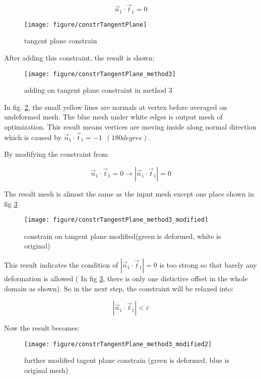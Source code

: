\begin{equation*}
\vec{n}_1 \cdot \vec{t}_1 = 0
\end{equation*}

\begin{figure}[h!]
\centering
\texttt{[image: figure/constrTangentPlane]}
\caption{tangent plane constrain}
\label{fig:constrtangentplane}
\end{figure}

After adding this constraint, the result is shown:

\begin{figure}[h!]
\centering
\texttt{[image: figure/constrTangentPlane\_method3]}
\caption{adding on tangent plane constraint in method 3}
\label{fig:constrtangentplanemethod3}
\end{figure}

In fig. \ref{fig:constrtangentplanemethod3}, the small yellow lines are normals at vertex before averaged on undeformed mesh. The blue mesh under white edges is output mesh of optimization. This result means vertices are moving inside along normal direction which is caused by $ \vec{n}_1 \cdot \vec{t}_1 = -1~~(180 degree ) $.

By modifying the constraint from 

\begin{equation*}
	\vec{n}_1 \cdot \vec{t}_1 = 0 \to  |\vec{n}_1 \cdot \vec{t}_1| = 0
\end{equation*}

The result mesh is almost the same as the input mesh except one place shown in fig \ref{fig:constrtangentplanemethod3modified}
\begin{figure}[h!]
\centering
\texttt{[image: figure/constrTangentPlane\_method3\_modified]}
\caption{constrain on tangent plane modified(green is deformed, white is original)}
\label{fig:constrtangentplanemethod3modified}
\end{figure}

This result indicates the condition of $ |\vec{n}_1 \cdot \vec{t}_1| = 0 $ is too strong so that barely any deformation is allowed ( In fig \ref{fig:constrtangentplanemethod3modified}, there is only one distictive offset in the whole domain as shown). So in the next step, the constraint will be relaxed into:

\begin{equation*}
	|\vec{n}_1 \cdot \vec{t}_1| < \varepsilon
\end{equation*}

Now the result becomes:

\begin{figure}[h!]
\centering
\texttt{[image: figure/constrTangentPlane\_method3\_modified2]}
\caption{further modified tagent plane constrain (green is deformed, blue is original mesh)}
\label{fig:constrtangentplanemethod3modified2}
\end{figure}
